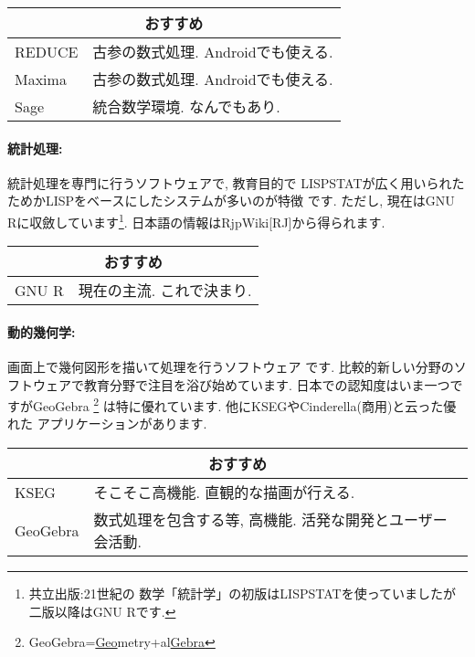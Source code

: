 \documentclass[b5j,8pt,twocolumn]{ltjsarticle}
\begin{document}
\vspace{0.5cm}
{\footnotesize
\begin{tabularx}{7cm}{l X}
\multicolumn{2}{c}{おすすめ}\\\hline
REDUCE& 古参の数式処理. Androidでも使える.\\
Maxima& 古参の数式処理. Androidでも使える.\\
Sage&   統合数学環境. なんでもあり.\\\hline
\end{tabularx}
}
\vspace{0.5cm}

\paragraph{統計処理:} 統計処理を専門に行うソフトウェアで, 教育目的で
LISPSTATが広く用いられたためかLISPをベースにしたシステムが多いのが特徴
です. ただし, 現在はGNU Rに収斂しています\footnote{共立出版:21世紀の
数学「統計学」の初版はLISPSTATを使っていましたが二版以降はGNU Rです.}.
 日本語の情報はRjpWiki[RJ]から得られます.

\vspace{0.5cm}
{\footnotesize
\begin{tabularx}{7cm}{l X}
\multicolumn{2}{c}{おすすめ}\\\hline
GNU R& 現在の主流. これで決まり.\\\hline
\end{tabularx}
}
\vspace{0.5cm}

\paragraph{動的幾何学:} 画面上で幾何図形を描いて処理を行うソフトウェア
です. 比較的新しい分野のソフトウェアで教育分野で注目を浴び始めています.
 日本での認知度はいま一つですがGeoGebra
 \footnote{GeoGebra=\underline{Geo}metry+al\underline{Gebra}}
は特に優れています. 他にKSEGやCinderella(商用)と云った優れた
アプリケーションがあります.


\vspace{0.5cm}
{\footnotesize
\begin{tabularx}{7cm}{l X}
\multicolumn{2}{c}{おすすめ}\\\hline
KSEG& そこそこ高機能. 直観的な描画が行える.\\
GeoGebra&  数式処理を包含する等, 高機能. 活発な開発とユーザー会活動.\\\hline
\end{tabularx}
}
\vspace{0.5cm}
\end{document}
